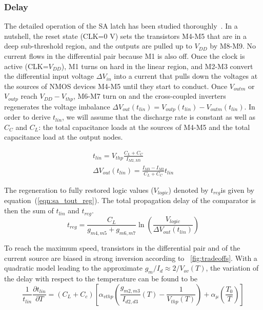 \subsubsection{Delay}
The detailed operation of the SA latch has been studied thoroughly~\cite{Wicht2004, Razavi2015}.
In a nutshell, the reset state (CLK=0 V) sets the transistors M4-M5 that are in a deep sub-threshold region, and the outputs are pulled up to \(V_{DD}\) by M8-M9. No current flows in the differential pair because M1 is also off.
Once the clock is active (CLK=\(V_{DD}\)), M1 turns on hard in the linear region, and M2-M3 convert the differential input voltage \(\Delta V_{in}\) into a current that pulls down the voltages at the sources of NMOS devices M4-M5 until they start to conduct.
Once \(V_{outm}\) or \(V_{outp}\) reach \(V_{DD}-V_{thp}\), M6-M7 turn on and the cross-coupled inverters regenerates the voltage imbalance \(\Delta V_{out}(t_{lin}) = V_{outp}(t_{lin}) - V_{outm}(t_{lin})\). In order to derive \(t_{lin}\), we will assume that the discharge rate is constant as well as \(C_{C}\) and \(C_{L}\): the total capacitance loads at the sources of M4-M5 and the total capacitance load at the output nodes.

\begin{eqnarray}
\label{eq:sa_tout_lin}
t_{lin} = V_{thp}\frac{{C_{L}+C_C}}{I_{M2,M3}}   \\
\Delta V_{out}(t_{lin}) = \frac{I_{M3}-I_{M2}}{{C_{L}+C_C}}t_{lin}  \label{eq:sa_dout_lin}
\end{eqnarray}

The regeneration to fully restored logic values (\(V_{logic}\)) denoted by \(t_{reg}\)is given by equation~(\ref{eqn:sa_tout_reg}). The total propagation delay of the comparator is then the sum of \(t_{lin}\) and \(t_{reg}\).
\begin{equation}
    \label{eqn:sa_tout_reg}
t_{reg} = \frac{C_{L}}{g_{m4,m5}+g_{m6,m7}} \ln{\left(\frac{V_{logic}}{\Delta V_{out}(t_{lin})}\right)}
\end{equation}

To reach the maximum speed, transistors in the differential pair and of the current source are biased in strong inversion according to \figurename~\ref{fig:tradeoffs}. With a quadratic model leading to the approximate \(g_m/I_d \approx 2/V_{ov}(T)\), the variation of the delay with respect to the temperature can be found to be
\begin{equation}
\label{eqn:sa_dt_dT}
\frac{1}{t_{lin}}\frac{\partial t_{lin}}{\partial T} = (C_L+C_c) \left[ \alpha_{vthp} \left(\frac{g_{m2,m3}}{I_{d2,d3}}(T) - \frac{1}{V_{thp}(T)} \right) + \alpha_\mu \left(\frac{T_0}{T} \right) \right]
\end{equation}

